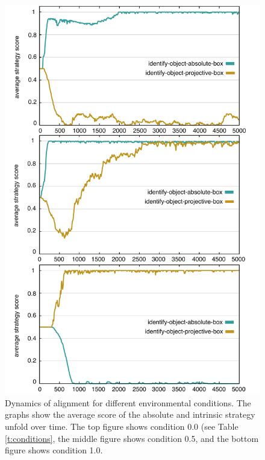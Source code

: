\begin{figure}
\begin{center}
\includegraphics[width=0.8\columnwidth]{figs/chunk-alignment-frames-absolute-vs-intrinsic-together}
\end{center}
\caption[Dynamics of alignment for different environmental conditions]{
Dynamics of alignment for different environmental conditions. 
The graphs show the average score of the absolute and intrinsic strategy 
unfold over time. The top figure shows condition 0.0 (see Table 
\ref{t:conditions}, the middle figure shows 
condition 0.5, and the bottom figure shows condition 1.0.}
\label{f:chunk-alignment-frames-absolute-vs-intrinsic-detail}
\end{figure}

